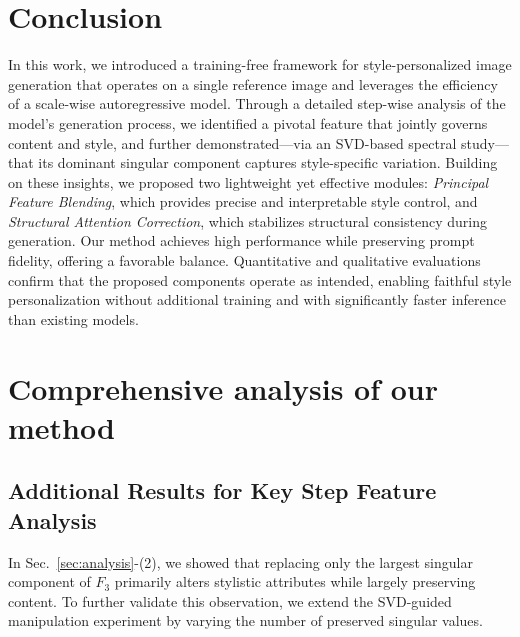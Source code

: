 \documentclass[10pt,twocolumn,letterpaper]{article}
\newcommand{\secref}[1]{Sec.~\ref{#1}}
\begin{document}
\section{Conclusion}
In this work, we introduced a training-free framework for style-personalized image generation that operates on a single reference image and leverages the efficiency of a scale-wise autoregressive model. Through a detailed step-wise analysis of the model’s generation process, we identified a pivotal feature that jointly governs content and style, and further demonstrated—via an SVD-based spectral study—that its dominant singular component captures style-specific variation. Building on these insights, we proposed two lightweight yet effective modules: \textit{Principal Feature Blending}, which provides precise and interpretable style control, and \textit{Structural Attention Correction}, which stabilizes structural consistency during generation.
Our method achieves high performance while preserving prompt fidelity, offering a favorable balance. Quantitative and qualitative evaluations confirm that the proposed components operate as intended, enabling faithful style personalization without additional training and with significantly faster inference than existing models.

\clearpage
\appendix
\maketitlesupplementary




\section{Comprehensive analysis of our method}



\subsection{Additional Results for Key Step Feature Analysis}

In \secref{sec:analysis}-(2), we showed that replacing only the largest singular component of $F_3$ primarily alters stylistic attributes while largely preserving content. To further validate this observation, we extend the SVD-guided manipulation experiment by varying the number of preserved singular values.
\end{document}

